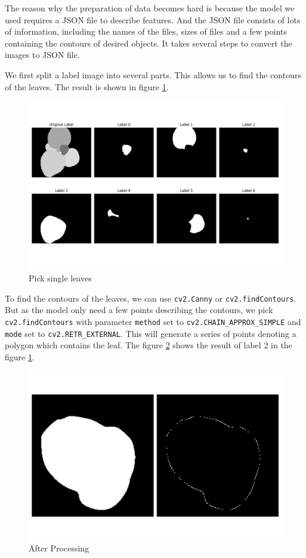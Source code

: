 \documentclass[conference]{IEEEtran}
\begin{document}
The reason why the preparation of data becomes hard is because the model we used requires a JSON file to describe features. And the JSON file consists of lots of information, including the names of the files, sizes of files and a few points containing the contours of desired objects. It takes several steps to convert the images to JSON file. 

We first split a label image into several parts. This allows us to find the contours of the leaves. The result is shown in figure  \ref{fig_conversion_1}.

\begin{figure}[h!]
    \centering
    \includegraphics[width=\linewidth]{img/conversion_1.png}
    \caption{Pick single leaves}
    \label{fig_conversion_1}
\end{figure}

To find the contours of the leaves, we can use \verb|cv2.Canny| or \verb|cv2.findContours|. But as the model only need a few points describing the contours, we pick \verb|cv2.findContours| with parameter \verb|method| set to \verb|cv2.CHAIN_APPROX_SIMPLE| and \verb|mode| set to \verb|cv2.RETR_EXTERNAL|. This will generate a series of points denoting a polygon which contains the leaf. The figure \ref{fig_conversion_2} shows the result of label 2 in the figure \ref{fig_conversion_1}.

\begin{figure}[h!]
    \centering
    \includegraphics[width=0.75\linewidth]{img/conversion_2_label_2_scaled_up.png}
    \caption{After Processing }
    \label{fig_conversion_2}
\end{figure}
\end{document}
